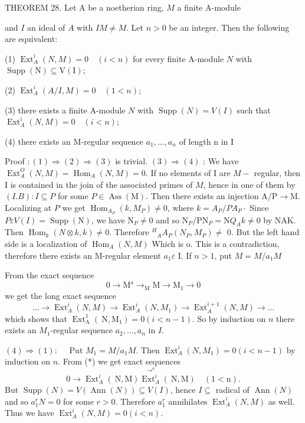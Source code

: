 THEOREM 28. Let A be a noetherian ring, $M$ a finite A-module

and $I$ an ideal of $A$ with $I M \neq M$. Let $n>0$ be an integer. Then the following are equivalent:

(1) $\operatorname{Ext}_{A}^{i}(N, M)=0 \quad(i<n)$ for every finite A-module $N$ with $\operatorname{Supp}(\mathrm{N}) \subseteq \mathrm{V}(\mathrm{I})$;

(2) $\operatorname{Ext}_{A}^{i}(A / I, M)=0 \quad(1<n)$;

(3) there exists a finite A-module $N$ with $\operatorname{Supp}(N)=V(I)$ such that $\operatorname{Ext}_{A}^{i}(N, M)=0 \quad(i<n)$;

(4) there exists an M-regular sequence $a_{1}, \ldots, a_{n}$ of length $\mathrm{n}$ in I

Proof $:(1) \Rightarrow(2) \Rightarrow(3)$ is trivial. $(3) \Rightarrow(4)$ : We have $\operatorname{Ext}_{A}^{O}(N, M)=\operatorname{Hom}_{A}(N, M)=0$. If no elements of I are $M-$ regular, then I is contained in the join of the associated primes of $M$, hence in one of them by $(I . B): I \subseteq P$ for some $P \in \operatorname{Ass}(\mathrm{M})$. Then there exists an injection $\mathrm{A} / \mathrm{P} \rightarrow \mathrm{M} .$ Localizing at $P$ we get $\operatorname{Hom}_{A_{P}}\left(k, M_{P}\right) \neq 0$, where $k=A_{P} / P A_{P} \cdot$ Since $P \varepsilon V(I)=\operatorname{Supp}(\mathrm{N})$, we have $\mathrm{N}_{P} \neq 0$ and so $\mathrm{N}_{P} / \mathrm{PN}_{P}=\mathrm{N} Q_{A} k \neq 0$ by NAK. Then $\operatorname{Hom}_{k}(N \otimes k, k) \neq 0$. Therefore ${ }^{H}{ }_{A} A_{P}\left(N_{P}, M_{P}\right) \neq$ 0. But the left hand side is a localization of $\operatorname{Hom}_{A}(N, M)$ Which is o. This is a contradiction, therefore there exists an M-regular element $a_{1} \varepsilon$ I. If $n>1$, put $M=M / a_{1} M$

From the exact sequence
$$
0 \rightarrow \mathrm{M}^{\mathrm{a}} \rightarrow_{\mathrm{M}} \mathrm{M} \rightarrow \mathrm{M}_{1} \rightarrow 0
$$
we get the long exact sequence
$$
\ldots \rightarrow \operatorname{Ext}_{A}^{i}(N, M) \rightarrow \operatorname{Ext}_{A}^{i}\left(N, M_{1}\right) \rightarrow \operatorname{Ext}_{A}^{i+1}(N, M) \rightarrow \ldots
$$
which shows that $\operatorname{Ext}_{\mathrm{A}}^{1}\left(\mathrm{~N}, \mathrm{M}_{1}\right)=0(i<n-1)$. So by induction on $n$ there exists an $M_{1}$-regular sequence $a_{2}, \ldots, a_{n}$ in $I$.

$(4) \Rightarrow(1): \quad$ Put $M_{1}=M / a_{1} M .$ Then $\operatorname{Ext}_{A}^{i}\left(N, M_{1}\right)=0(i<n-1)$ by induction on $n$. From (*) we get exact sequences
$$
0 \rightarrow \operatorname{Ext}_{A}^{i}(\mathrm{~N}, \mathrm{M}) \stackrel{\rightarrow^{a}}{\operatorname{Ext}_{A}^{i}}(\mathrm{~N}, \mathrm{M}) \quad(1<\mathrm{n}) .
$$
But $\operatorname{Supp}(N)=V(\operatorname{Ann}(N)) \subseteq V(I)$, hence $I \subseteq$ radical of $\operatorname{Ann}(N)$ and so $a_{1}^{r} N=0$ for some $r>0$. Therefore $a_{1}^{r}$ annihilates $\operatorname{Ext}_{A}^{i}(N, M)$ as well. Thus we have $\operatorname{Ext}_{A}^{i}(N, M)=0(i<n)$.

